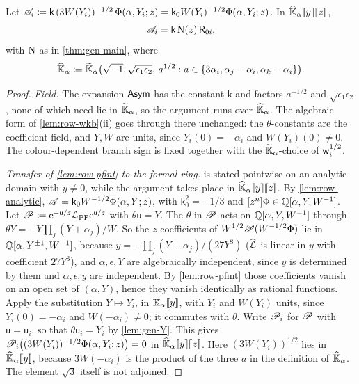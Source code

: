 \begin{prop}
\label{prop:gen-osc}
Let $\mathscr{A}_i\coloneqq\mathsf{k}\,(3W(Y_i))^{-1/2}\,\Phi(\alpha,Y_i;z)=\mathsf{k}_0W(Y_i)^{-1/2}\Phi(\alpha,Y_i;z)$. In $\widehat{\mathbb{K}}_{\alpha}[\![ y ]\!][\![ z ]\!]$,
\[
\mathscr{A}_i=\mathsf{k}\,\mathrm{N}(z)\,\mathsf{R}_{0i},
\]
with $\mathrm{N}$ as in \cref{thm:gen-main}, where
\[
\widehat{\mathbb{K}}_{\alpha}\coloneqq\widetilde{\mathbb{K}}_{\alpha}\big(\sqrt{-1},\sqrt{\epsilon_1\epsilon_2},\,a^{1/2}:a\in\{3\alpha_i,\alpha_j-\alpha_i,\alpha_k-\alpha_i\}\big).
\]
\end{prop}
\begin{proof}
\emph{Field.} The expansion $\mathsf{Asym}$ has the constant $\mathsf{k}$ and factors $a^{-1/2}$ and $\sqrt{\epsilon_1\epsilon_2}$, none of which need lie in $\widetilde{\mathbb{K}}_{\alpha}$, so the argument runs over $\widehat{\mathbb{K}}_{\alpha}$. The algebraic form of \cref{lem:row-wkb}(ii) goes through there unchanged: the $\theta$-constants are the coefficient field, and $Y,W$ are units, since $Y_i(0)=-\alpha_i$ and $W(Y_i)(0)\neq0$. The colour-dependent branch sign is fixed together with the $\widetilde{\mathbb{K}}_{\alpha}$-choice of $\mathsf{w}_i^{1/2}$.

\emph{Transfer of \cref{lem:row-pfint} to the formal ring.}  is stated pointwise on an analytic domain with $y\neq0$, while the argument takes place in $\widehat{\mathbb{K}}_{\alpha}[\![ y ]\!][\![ z ]\!]$. By \cref{lem:row-analytic}, $\mathscr{A}=\mathsf{k}_0W^{-1/2}\Phi(\alpha,Y;z)$, with $\mathsf{k}_0^2=-1/3$ and $[z^n]\Phi\in\mathbb{Q}[\alpha,Y,W^{-1}]$. Let $\mathscr{P}\coloneqq\mathrm{e}^{-\mathsf{u}/z}\mathcal{L}_{\mathrm{PF}}\mathrm{e}^{\mathsf{u}/z}$ with $\theta\mathsf{u}=Y$. The $\theta$ in $\mathscr{P}$ acts on $\mathbb{Q}[\alpha,Y,W^{-1}]$ through $\theta Y=-Y\prod_j(Y+\alpha_j)/W$. So the $z$-coefficients of $W^{1/2}\mathscr{P}(W^{-1/2}\Phi)$ lie in $\mathbb{Q}[\alpha,Y^{\pm1},W^{-1}]$, because $y=-\prod_j(Y+\alpha_j)/(27Y^3)$ ($\widehat{\mathcal{L}}$ is linear in $y$ with coefficient $27Y^3$), and $\alpha,\epsilon,Y$ are algebraically independent, since $y$ is determined by them and $\alpha,\epsilon,y$ are independent. By \cref{lem:row-pfint} those coefficients vanish on an open set of $(\alpha,Y)$, hence they vanish identically as rational functions. Apply the substitution $Y\mapsto Y_i$, in $\mathbb{K}_{\alpha}[\![ y ]\!]$, with $Y_i$ and $W(Y_i)$ units, since $Y_i(0)=-\alpha_i$ and $W(-\alpha_i)\neq0$; it commutes with $\theta$. Write $\mathscr{P}_i$ for $\mathscr{P}$ with $\mathsf{u}=\mathsf{u}_i$, so that $\theta\mathsf{u}_i=Y_i$ by \cref{lem:gen-Y}. This gives $\mathscr{P}_i\big((3W(Y_i))^{-1/2}\Phi(\alpha,Y_i;z)\big)=0$ in $\widehat{\mathbb{K}}_{\alpha}[\![ y ]\!][\![ z ]\!]$. Here $(3W(Y_i))^{1/2}$ lies in $\widehat{\mathbb{K}}_{\alpha}[\![ y ]\!]$, because $3W(-\alpha_i)$ is the product of the three $a$ in the definition of $\widehat{\mathbb{K}}_{\alpha}$. The element $\sqrt3$ itself is not adjoined.


\end{proof}
